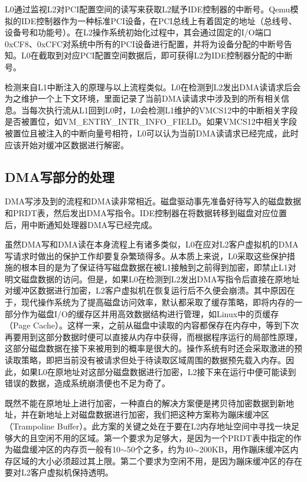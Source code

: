 L0通过监视L2对PCI配置空间的读写来获取L2赋予IDE控制器的中断号\cite{pci}。Qemu模拟的IDE控制器作为一种标准PCI设备，在PCI总线上有着固定的地址（总线号、设备号和功能号）。在L2操作系统初始化过程中，其会通过固定的I/O端口0xCF8、0xCFC对系统中所有的PCI设备进行配置，并将为设备分配的中断号告知。L0在截取到对应PCI配置空间数据后，即可获得L2为IDE控制器分配的中断号。

检测来自L1中断注入的原理与以上流程类似。L0在检测到L2发出DMA读请求后会为之维护一个上下文环境，里面记录了当前DMA读请求中涉及到的所有相关信息。当每次执行流从L1回到L0时，L0会检测L1维护的VMCS12中的中断相关字段是否被置位，如VM\_ENTRY\_INTR\_INFO\_FIELD。如果VMCS12中相关字段被置位且被注入的中断向量号相符，L0可以认为当前DMA读请求已经完成，此时应该开始对缓冲区数据进行解密。

\subsection{DMA写部分的处理}

DMA写涉及到的流程和DMA读非常相近。磁盘驱动事先准备好待写入的磁盘数据和PRDT表，然后发出DMA写指令。IDE控制器在将数据转移到磁盘对应位置后，用中断通知处理器DMA写已经完成。

虽然DMA写和DMA读在本身流程上有诸多类似，L0在应对L2客户虚拟机的DMA写请求时做出的保护工作却要复杂繁琐得多。从本质上来说，L0采取这些保护措施的根本目的是为了保证待写磁盘数据在被L1接触到之前得到加密，即禁止L1对明文磁盘数据的访问。但是，如果L0在检测到L2发出DMA写指令后直接在原地址对缓冲区数据进行加密，L2客户虚拟机在恢复运行后不久便会崩溃。其中原因在于，现代操作系统为了提高磁盘访问效率，默认都采取了缓存策略，即将内存的一部分作为磁盘I/O的缓存区并用高效数据结构进行管理，如Linux中的页缓存（Page Cache）。这样一来，之前从磁盘中读取的内容都保存在内存中，等到下次再要用到这部分数据时便可以直接从内存中获得，而根据程序运行的局部性原理，这部分磁盘数据在接下来被用到的概率是很大的。操作系统有时还会采取激进的预读取策略，即把当前没有被请求但处于待读取区域周围的数据预先载入内存。因此，如果L0在原地址对这部分磁盘数据进行加密，L2接下来在运行中便可能读到错误的数据，造成系统崩溃便也不足为奇了。

既然不能在原地址上进行加密，一种直白的解决方案便是拷贝待加密数据到新地址，并在新地址上对磁盘数据进行加密，我们把这种方案称为蹦床缓冲区（Trampoline Buffer）。此方案的关键之处在于要在L2内存地址空间中寻找一块足够大的且空闲不用的区域。第一个要求为足够大，是因为一个PRDT表中指定的作为磁盘缓冲区的内存页一般有10$\sim$50个之多，约为40$\sim$200KB，用作蹦床缓冲区内存区域的大小必须超过其上限。第二个要求为空闲不用，是因为蹦床缓冲区的存在要对L2客户虚拟机保持透明。

